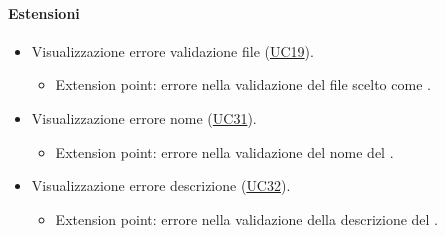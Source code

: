 \paragraph*{Estensioni}
\begin{itemize}
  \item Visualizzazione errore validazione file (\hyperref[UC19]{UC19}).
  \begin{itemize}
    \item Extension point: errore nella validazione del file scelto come .
  \end{itemize}
  \item Visualizzazione errore nome  (\hyperref[UC31]{UC31}).
  \begin{itemize}
    \item Extension point: errore nella validazione del nome del .
  \end{itemize}
  \item Visualizzazione errore descrizione  (\hyperref[UC32]{UC32}).
  \begin{itemize}
    \item Extension point: errore nella validazione della descrizione del .
  \end{itemize}
\end{itemize}
